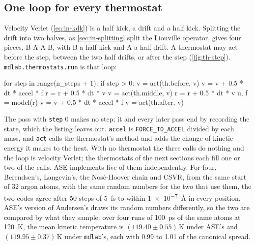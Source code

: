 \subsection*{One loop for every thermostat}

Velocity Verlet (\cref{eq:in-kdk}) is a half kick, a drift and a half
kick. Splitting the drift into two halves, as \cref{sec:in-splitting}
split the Liouville operator, gives four pieces, B A A B, with B a half
kick and A a half drift. A thermostat may act before the step, between the
two half drifts, or after the step (\cref{fig:th-step}).
\texttt{mdlab.thermostats.run} is that loop:

\begin{code}
    for step in range(n_steps + 1):
        if step > 0:
            v = act(th.before, v)
            v = v + 0.5 * dt * accel * f
            r = r + 0.5 * dt * v
            v = act(th.middle, v)
            r = r + 0.5 * dt * v
            u, f = model(r)
            v = v + 0.5 * dt * accel * f
            v = act(th.after, v)
\end{code}

\noindent The pass with \texttt{step} 0 makes no step; it and every later
pass end by recording the state, which the listing leaves out.
\texttt{accel} is \texttt{FORCE\_TO\_ACCEL} divided by each mass, and \texttt{act} calls the thermostat's method and adds the change
of kinetic energy it makes to the heat. With no thermostat the three
calls do nothing and the loop is velocity Verlet; the thermostats of the
next sections each fill one or two of the calls. ASE implements five of
them independently. For four, Berendsen's, Langevin's, the Nosé-Hoover
chain and CSVR, from the same start of 32 argon atoms, with the same
random numbers for the two that use them, the two codes agree after 50
steps of \SI{5}{\femto\second} to within \SI{1e-7}{\angstrom} in every
position. ASE's version of Andersen's draws its random numbers
differently, so the two are compared by what they sample: over four runs
of \SI{100}{\pico\second} of the same atoms at \SI{120}{\kelvin}, the
mean kinetic temperature is $(119.40 \pm 0.55)$\,\si{\kelvin} under ASE's
and $(119.95 \pm 0.37)$\,\si{\kelvin} under \texttt{mdlab}'s, each with
0.99 to 1.01 of the canonical spread.

